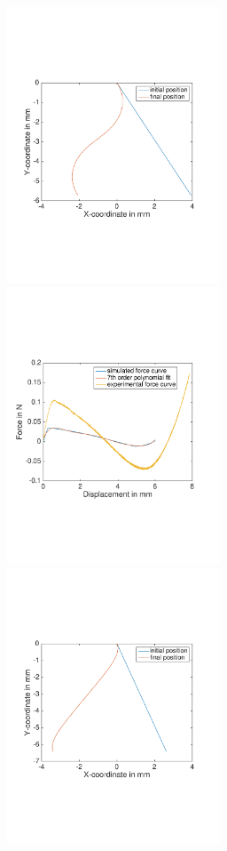 \documentclass[10pt]{article}
\begin{document}
\begin{figure}[h]
\centering
\includegraphics[width=2.5in]{beamBending}
\includegraphics[width=2.5in]{forceDisplacementSimulated}
\includegraphics[width=2.5in]{beamBending2}

\end{figure}
\end{document}
